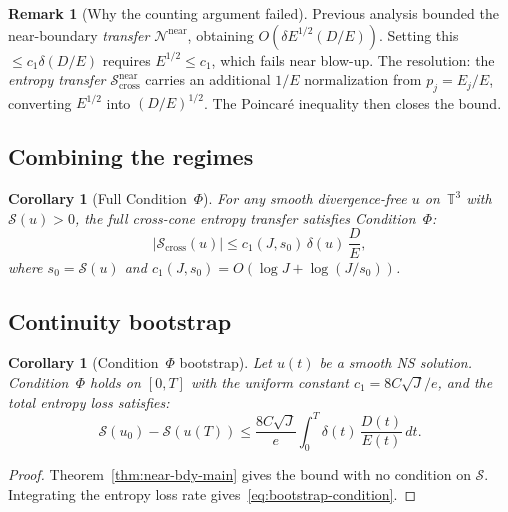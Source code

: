 \documentclass[11pt]{article}
\newtheorem{corollary}[theorem]{Corollary}
\theoremstyle{definition}
\newtheorem{remark}[theorem]{Remark}
\newcommand{\T}{\mathbb{T}}
\newcommand{\cS}{\mathcal{S}}
\newcommand{\cN}{\mathcal{N}}
\begin{document}
\begin{remark}[Why the counting argument failed]
\label{rem:counting}
Previous analysis bounded the near-boundary
\emph{transfer} $\cN^{\mathrm{near}}$, obtaining
$O(\delta E^{1/2}(D/E))$.  Setting this $\leq c_1\delta(D/E)$
requires $E^{1/2} \leq c_1$, which fails near blow-up.
The resolution: the \emph{entropy transfer}
$\cS_{\mathrm{cross}}^{\mathrm{near}}$ carries an
additional $1/E$ normalization from $p_j = E_j/E$,
converting $E^{1/2}$ into $(D/E)^{1/2}$.  The Poincar\'e
inequality then closes the bound.
\end{remark}


\subsection{Combining the regimes}

\begin{corollary}[Full Condition~$\Phi$]
\label{cor:full-Phi}
For any smooth divergence-free $u$ on~$\T^3$ with
$\cS(u) > 0$, the full cross-cone entropy transfer
satisfies Condition~$\Phi$:
\begin{equation}
|\cS_{\mathrm{cross}}(u)|
\leq c_1(J, s_0)\,\delta(u)\,\frac{D}{E},
\end{equation}
where $s_0 = \cS(u)$ and
$c_1(J,s_0) = O(\log J + \log(J/s_0))$.
\end{corollary}


\subsection{Continuity bootstrap}
\label{sec:near-boundary-bootstrap}

\begin{corollary}[Condition~$\Phi$ bootstrap]
\label{cor:bootstrap}
Let $u(t)$ be a smooth NS solution.
Condition~$\Phi$ holds on $[0,T]$ with the uniform constant
$c_1 = 8C\sqrt{J}/e$, and the total entropy loss satisfies:
\begin{equation}\label{eq:bootstrap-condition}
\cS(u_0) - \cS(u(T))
\leq \frac{8C\sqrt{J}}{e}
\int_0^T\delta(t)\,\frac{D(t)}{E(t)}\,dt.
\end{equation}
\end{corollary}

\begin{proof}
Theorem~\ref{thm:near-bdy-main} gives the bound with
no condition on $\cS$.  Integrating the entropy loss
rate gives~\eqref{eq:bootstrap-condition}.
\end{proof}
\end{document}
